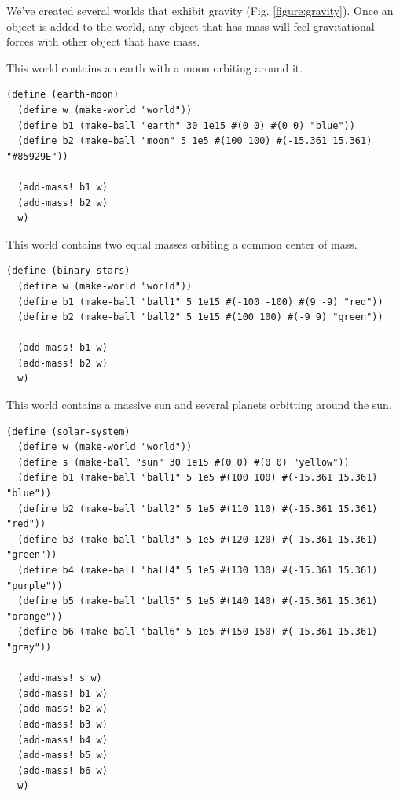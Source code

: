 \documentclass{article}
\begin{document}
We've created several worlds that exhibit gravity (Fig. \ref{figure:gravity}). Once an object is added to the world, any object that has mass will feel gravitational forces with other object that have mass.

This world contains an earth with a moon orbiting around it.
{\small\begin{verbatim}
(define (earth-moon)
  (define w (make-world "world"))
  (define b1 (make-ball "earth" 30 1e15 #(0 0) #(0 0) "blue"))
  (define b2 (make-ball "moon" 5 1e5 #(100 100) #(-15.361 15.361) "#85929E"))

  (add-mass! b1 w)
  (add-mass! b2 w)
  w)
\end{verbatim}}

This world contains two equal masses orbiting a common center of mass.
{\small\begin{verbatim}
(define (binary-stars)
  (define w (make-world "world"))
  (define b1 (make-ball "ball1" 5 1e15 #(-100 -100) #(9 -9) "red"))
  (define b2 (make-ball "ball2" 5 1e15 #(100 100) #(-9 9) "green"))

  (add-mass! b1 w)
  (add-mass! b2 w)
  w)
\end{verbatim}}

This world contains a massive sun and several planets orbitting around the sun.
{\small\begin{verbatim}
(define (solar-system)
  (define w (make-world "world"))
  (define s (make-ball "sun" 30 1e15 #(0 0) #(0 0) "yellow"))
  (define b1 (make-ball "ball1" 5 1e5 #(100 100) #(-15.361 15.361) "blue"))
  (define b2 (make-ball "ball2" 5 1e5 #(110 110) #(-15.361 15.361) "red"))
  (define b3 (make-ball "ball3" 5 1e5 #(120 120) #(-15.361 15.361) "green"))
  (define b4 (make-ball "ball4" 5 1e5 #(130 130) #(-15.361 15.361) "purple"))
  (define b5 (make-ball "ball5" 5 1e5 #(140 140) #(-15.361 15.361) "orange"))
  (define b6 (make-ball "ball6" 5 1e5 #(150 150) #(-15.361 15.361) "gray"))

  (add-mass! s w)
  (add-mass! b1 w)
  (add-mass! b2 w)
  (add-mass! b3 w)
  (add-mass! b4 w)
  (add-mass! b5 w)
  (add-mass! b6 w)
  w)
\end{verbatim}}
\end{document}
